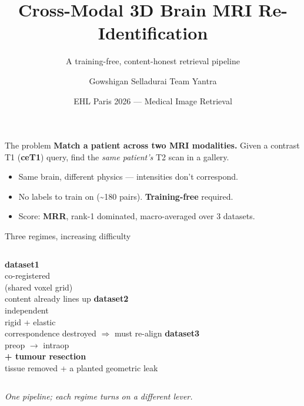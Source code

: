 \documentclass[aspectratio=169,11pt]{beamer}
\title{Cross-Modal 3D Brain MRI Re-Identification}
\subtitle{A training-free, content-honest retrieval pipeline}
\author{Gowshigan Selladurai \quad\textbar\quad Team Yantra}
\date{EHL Paris 2026 — Medical Image Retrieval}
\begin{document}
\maketitle

\begin{frame}{The problem}
  \textbf{Match a patient across two MRI modalities.}
  Given a contrast T1 (\textbf{ceT1}) query, find the \emph{same patient's} T2 scan in a gallery.
  \begin{itemize}
    \item Same brain, \alert{different physics} — intensities don't correspond.
    \item No labels to train on (\textasciitilde180 pairs). \textbf{Training-free} required.
    \item Score: \textbf{MRR}, rank-1 dominated, macro-averaged over 3 datasets.
  \end{itemize}
  \vfill
  \begin{center}
  \end{center}
\end{frame}

\begin{frame}{Three regimes, increasing difficulty}
  \begin{columns}[t]
    \centering
      \textbf{\color{acc}dataset1}\\[2mm]
      co-registered\\(shared voxel grid)\\[2mm]
      \footnotesize content already lines up
    \centering
      \textbf{\color{acc}dataset2}\\[2mm]
      independent\\rigid + elastic\\[2mm]
      \footnotesize correspondence \alert{destroyed} $\Rightarrow$ must re-align
    \centering
      \textbf{\color{acc}dataset3}\\[2mm]
      preop $\to$ intraop\\\textbf{+ tumour resection}\\[2mm]
      \footnotesize tissue \alert{removed} + a planted geometric leak
  \end{columns}
  \vfill
  \begin{center}\itshape One pipeline; each regime turns on a different lever.\end{center}
\end{frame}
\end{document}
